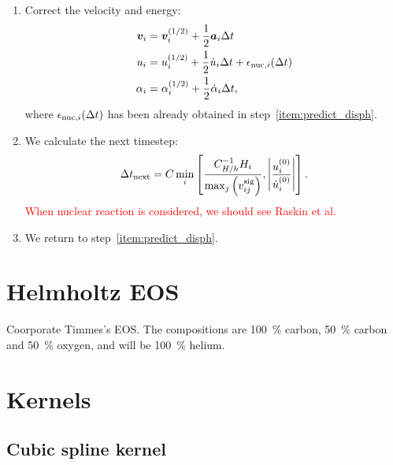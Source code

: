 \documentclass[fleqn,dvipdfmx]{article}
\newcommand{\redtext}[1]{\textcolor{red}{#1}}
\begin{document}
\begin{enumerate}
\item Correct the velocity and energy:
  \begin{align}
    \bm{v}_i &= \bm{v}^{(1/2)}_i + \frac{1}{2} \bm{a}_i \Delta t \\
    u_i &= u^{(1/2)}_i + \frac{1}{2} \dot{u}_i \Delta t +
    \epsilon_{{\rm nuc},i}(\Delta t) \\
    \alpha_i &= \alpha^{(1/2)}_i + \frac{1}{2} \dot{\alpha}_i \Delta
    t,
  \end{align}
  where $\epsilon_{{\rm nuc},i}(\Delta t)$ has been already obtained
  in step~\ref{item:predict_disph}.

\item We calculate the next timestep:
  \begin{align}
    \Delta t_{\rm next} = C \min_i \left[
      \frac{C_{H/h}^{-1}H_i}{\max_j \left( v_{ij}^{\rm sig} \right) },
      \left| \frac{u_i^{(0)}}{\dot{u}_i^{(0)}} \right| \right].
  \end{align}  
  \redtext{When nuclear reaction is considered, we should see Raskin
    et al.}

\item We return to step~\ref{item:predict_disph}.

\end{enumerate}

\section{Helmholtz EOS}

Coorporate Timmes's EOS. The compositions are 100~\% carbon, 50~\%
carbon and 50~\% oxygen, and will be 100~\% helium.

\appendix

\section{Kernels}
\label{sec:kernels}

\subsection{Cubic spline kernel}
\end{document}

